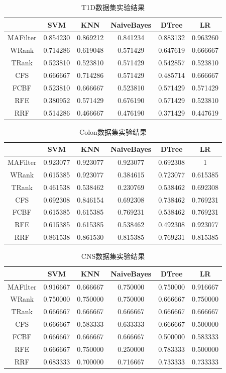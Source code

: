 \begin{table}        
\centering
\caption{T1D数据集实验结果}
\begin{tabular}{cccccc}
\hline
  & SVM & KNN & NaiveBayes & DTree & LR\\
\hline
MAFilter&0.854230&	0.869212&	0.841234&	0.883132&	0.963260\\
WRank&	0.714286&	0.619048&	0.571429&	0.647619&	0.666667\\
TRank&	0.523810&	0.523810&	0.571429&	0.542857&	0.523810\\
CFS&	0.666667&	0.714286&	0.571429&	0.485714&	0.666667\\
FCBF&	0.523810&	0.666667&	0.523810&	0.571429&	0.571429\\
RFE&	0.380952&	0.571429&	0.676190&	0.571429&	0.523810\\
RRF&	0.514286&	0.466667&	0.476190&	0.371429&	0.447619\\
\hline
\end{tabular}
\end{table}

\begin{table}        
\centering
\caption{Colon数据集实验结果}
\begin{tabular}{cccccc}
\hline
  & SVM & KNN & NaiveBayes & DTree & LR\\
\hline
MAFilter&0.923077&	0.923077&	0.923077&	0.692308&	1\\
WRank&	0.615385&	0.923077&	0.384615&	0.723077&	0.615385\\
TRank&	0.461538&	0.538462&	0.230769&	0.538462&	0.692308\\
CFS&	0.692308&	0.846154&	0.692308&	0.738462&	0.769231\\
FCBF&	0.615385&	0.615385&	0.769231&	0.538462&	0.769231\\
RFE&	0.615385&	0.615385&	0.538462&	0.492308&	0.923077\\
RRF&	0.861538&	0.861530&	0.815385&	0.769231&	0.815385\\
\hline
\end{tabular}
\end{table}

\begin{table}        
\centering
\caption{CNS数据集实验结果}
\begin{tabular}{cccccc}
\hline
  & SVM & KNN & NaiveBayes & DTree & LR\\
\hline
MAFilter&0.916667&	0.666667&	0.750000&	0.750000&	0.916667\\
WRank&	0.750000&	0.750000&	0.750000&	0.666667&	0.750000\\
TRank&	0.666667&	0.666667&	0.666667&	0.666667&	0.666667\\
CFS&	0.666667&	0.583333&	0.633333&	0.666667&	0.500000\\
FCBF&	0.666667&	0.666667&	0.666667&	0.500000&	0.583333\\
RFE&	0.666667&	0.750000&	0.250000&	0.783333&	0.500000\\
RRF&	0.683333&	0.700000&	0.716667&	0.733333&	0.733333\\  
\hline
\end{tabular}
\end{table}

